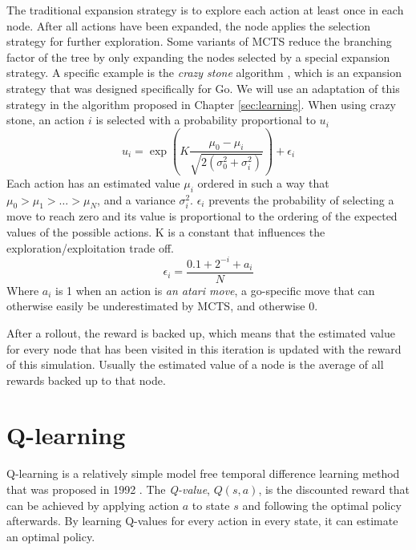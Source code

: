 The traditional expansion strategy is to explore each action at least once in
each node. After all actions have been expanded, the node applies the selection
strategy for further exploration. Some variants of MCTS reduce the branching
factor of the tree by only expanding the nodes selected by a special expansion
strategy. A specific example is the \emph{crazy stone} algorithm
\cite{coulom2007efficient}, which is an expansion strategy that was designed
specifically for Go. We will use an adaptation of this strategy in the algorithm
proposed in Chapter \ref{sec:learning}.  When using crazy stone, an action $i$
is selected with a probability proportional to $u_i$
\begin{equation}
	\label{eq:crazystone}
	u_i = \exp\left(K \frac{\mu_0 - \mu_i}{\sqrt{2\left(\sigma_0^2 +
\sigma_i^2\right)}}\right) + \epsilon_i
\end{equation}
Each action has an estimated value $\mu_i$ ordered in such a way that $\mu_0 >
\mu_1 > \ldots > \mu_N$, and a variance $\sigma_i^2$. $\epsilon_i$ prevents 
the probability of selecting a move to reach zero and its value is proportional to
the ordering of the expected values of the possible actions. K is a constant
that influences the exploration/exploitation trade off.
\begin{equation}
	\label{eq:epsilon}
	\epsilon_i = \frac{0.1 + 2^{-i} + a_i}{N}
\end{equation}
Where $a_i$ is 1 when an action is \emph{an atari move}, a go-specific
move that can otherwise easily be underestimated by MCTS, and otherwise 0.

After a rollout, the reward is backed up, which means that the estimated value
for every node that has been visited in this iteration is updated with the
reward of this simulation. Usually the estimated value of a node is the average
of all rewards backed up to that node.

\section{Q-learning}
\label{subsec:qlearning}
Q-learning is a relatively simple model free temporal difference learning method
that was proposed in 1992 \cite{watkins1992q}. The \emph{Q-value}, $Q(s, a)$, is
the discounted reward that can be achieved by applying action $a$ to state $s$
and following the optimal policy afterwards. By learning Q-values for every
action in every state, it can estimate an optimal policy. 

